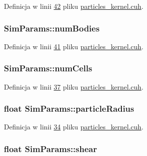 Definicja w linii \hyperlink{particles__kernel_8cuh_source_l00042}{42} pliku \hyperlink{particles__kernel_8cuh_source}{particles\-\_\-kernel.\-cuh}.

\hypertarget{struct_sim_params_adb68e9ee2422208807756b367efdf842}{
\subsubsection[{num\-Bodies}]{ Sim\-Params\-::num\-Bodies}}\label{struct_sim_params_adb68e9ee2422208807756b367efdf842}


Definicja w linii \hyperlink{particles__kernel_8cuh_source_l00041}{41} pliku \hyperlink{particles__kernel_8cuh_source}{particles\-\_\-kernel.\-cuh}.

\hypertarget{struct_sim_params_a9d51112b7e86d46b6f33126a67cc84b4}{
\subsubsection[{num\-Cells}]{ Sim\-Params\-::num\-Cells}}\label{struct_sim_params_a9d51112b7e86d46b6f33126a67cc84b4}


Definicja w linii \hyperlink{particles__kernel_8cuh_source_l00037}{37} pliku \hyperlink{particles__kernel_8cuh_source}{particles\-\_\-kernel.\-cuh}.

\hypertarget{struct_sim_params_a7e131c24e1020c44173deb0f57a8c4af}{
\subsubsection[{particle\-Radius}]{\setlength{\rightskip}{0pt plus 5cm}float Sim\-Params\-::particle\-Radius}}\label{struct_sim_params_a7e131c24e1020c44173deb0f57a8c4af}


Definicja w linii \hyperlink{particles__kernel_8cuh_source_l00034}{34} pliku \hyperlink{particles__kernel_8cuh_source}{particles\-\_\-kernel.\-cuh}.

\hypertarget{struct_sim_params_ad48210724ada15a14a649b25ad61575b}{
\subsubsection[{shear}]{\setlength{\rightskip}{0pt plus 5cm}float Sim\-Params\-::shear}}\label{struct_sim_params_ad48210724ada15a14a649b25ad61575b}


